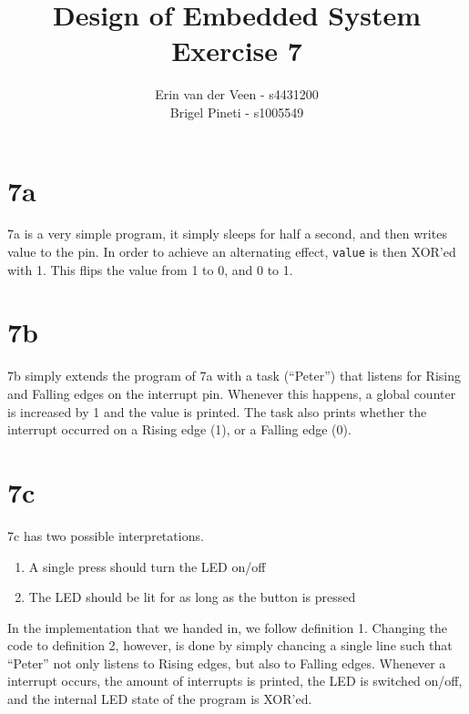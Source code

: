 \documentclass{scrartcl}
\title{Design of Embedded System\\Exercise 7}
\author{Erin van der Veen - s4431200\\
	Brigel Pineti - s1005549}
\begin{document}
\maketitle

\section*{7a}
7a is a very simple program, it simply sleeps for half a second, and then writes value to the pin.
In order to achieve an alternating effect, \lstinline|value| is then XOR'ed with 1.
This flips the value from 1 to 0, and 0 to 1.

\section*{7b}
7b simply extends the program of 7a with a task (``Peter'') that listens for Rising and Falling edges on the interrupt pin.
Whenever this happens, a global counter is increased by 1 and the value is printed.
The task also prints whether the interrupt occurred on a Rising edge (1), or a Falling edge (0).

\section*{7c}
7c has two possible interpretations.
\begin{enumerate}
	\item A single press should turn the LED on/off
	\item The LED should be lit for as long as the button is pressed
\end{enumerate}
In the implementation that we handed in, we follow definition 1.
Changing the code to definition 2, however, is done by simply chancing a single line such that ``Peter'' not only listens to Rising edges, but also to Falling edges.
Whenever a interrupt occurs, the amount of interrupts is printed, the LED is switched on/off, and the internal LED state of the program is XOR'ed.
\end{document}
